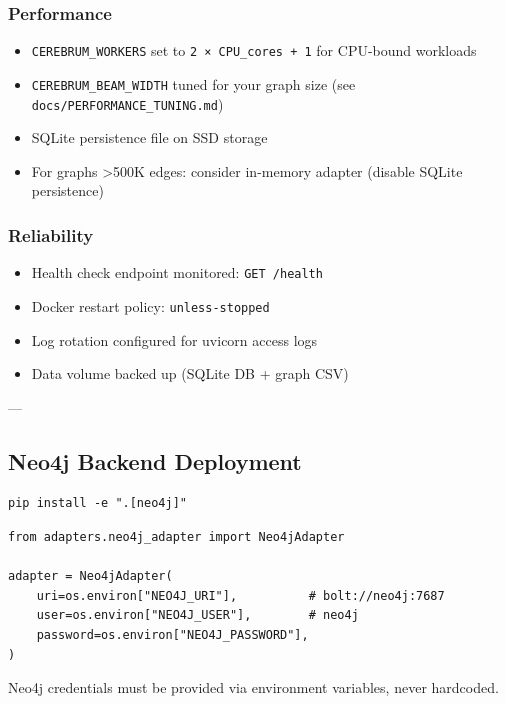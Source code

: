 \documentclass[11pt,article,oneside]{memoir}
\begin{document}
\subsubsection{Performance}
\begin{itemize}
\item [ ] \texttt{CEREBRUM\_WORKERS} set to \texttt{2 × CPU\_cores + 1} for CPU-bound workloads
\item [ ] \texttt{CEREBRUM\_BEAM\_WIDTH} tuned for your graph size (see \texttt{docs/PERFORMANCE\_TUNING.md})
\item [ ] SQLite persistence file on SSD storage
\item [ ] For graphs \textgreater  500K edges: consider in-memory adapter (disable SQLite persistence)

\end{itemize}
\subsubsection{Reliability}
\begin{itemize}
\item [ ] Health check endpoint monitored: \texttt{GET /health}
\item [ ] Docker restart policy: \texttt{unless-stopped}
\item [ ] Log rotation configured for uvicorn access logs
\item [ ] Data volume backed up (SQLite DB + graph CSV)

\end{itemize}
---

\subsection{Neo4j Backend Deployment}

\begin{lstlisting}
pip install -e ".[neo4j]"
\end{lstlisting}

\begin{lstlisting}
from adapters.neo4j_adapter import Neo4jAdapter

adapter = Neo4jAdapter(
    uri=os.environ["NEO4J_URI"],          # bolt://neo4j:7687
    user=os.environ["NEO4J_USER"],        # neo4j
    password=os.environ["NEO4J_PASSWORD"],
)
\end{lstlisting}

Neo4j credentials must be provided via environment variables, never hardcoded.
\end{document}
